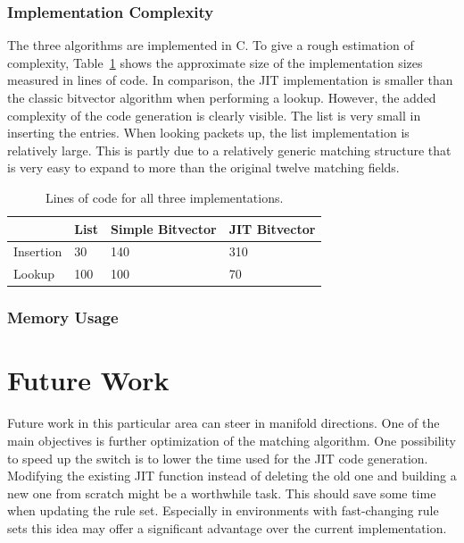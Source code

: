 \documentclass[a4paper,
		12pt,
		parskip=full,
		titlepage
		]{scrartcl}
\begin{document}
\subsubsection{Implementation Complexity}
The three algorithms are implemented in C.
To give a rough estimation of complexity, Table~\ref{table:loc} shows the 
approximate size of the implementation sizes measured in lines of code.
In comparison, the JIT implementation is smaller than the classic bitvector algorithm when performing a lookup.
However, the added complexity of the code generation is clearly visible.
The list is very small in inserting the entries.
When looking packets up, the list implementation is relatively large.
This is partly due to a relatively generic matching structure that is very 
easy to expand to more than the original twelve matching fields.

\begin{table}
  \centering
  \begin{tabularx}{\textwidth}{l|XXX}
  &List&Simple Bitvector&JIT Bitvector\\
  \hline
  Insertion&30&140&310\\
  Lookup&100&100&70\\
  \end{tabularx}
  \caption{Lines of code for all three implementations.}
  \label{table:loc}
\end{table}

\subsubsection{Memory Usage}

\section{Future Work}
Future work in this particular area can steer in manifold directions.
One of the main objectives is further optimization of the matching algorithm.
One possibility to speed up the switch is to lower the time used for the JIT code generation.
Modifying the existing JIT function instead of deleting the old one and building 
a new one from scratch might be a worthwhile task.
This should save some time when updating the rule set.
Especially in environments with fast-changing rule sets this idea may offer 
a significant advantage over the current implementation.
\end{document}

